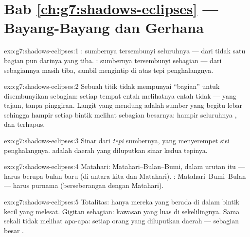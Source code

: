 \section*{Bab \ref{ch:g7:shadows-eclipses} --- Bayang-Bayang dan Gerhana}

\begin{solution}{exo:g7:shadows-eclipses:1}
: sumbernya tersembunyi seluruhnya ---  dari tidak satu
bagian pun darinya yang tiba. : sumbernya tersembunyi sebagian
---  dari sebagiannya masih tiba, sambil mengintip di atas tepi
penghalangnya.
\end{solution}

\begin{solution}{exo:g7:shadows-eclipses:2}
Sebuah titik tidak mempunyai ``bagian'' untuk disembunyikan sebagian:
setiap tempat entah melihatnya entah tidak ---  yang
tajam, tanpa pinggiran. Langit yang mendung adalah sumber yang begitu
lebar sehingga hampir setiap bintik melihat sebagian besarnya: hampir
seluruhnya , dan  terhapus.
\end{solution}

\begin{solution}{exo:g7:shadows-eclipses:3}
Sinar dari \emph{tepi} sumbernya, yang menyerempet sisi penghalangnya.
 adalah daerah yang diluputkan sinar kedua tepinya.
\end{solution}

\begin{solution}{exo:g7:shadows-eclipses:4}
Matahari: Matahari--Bulan--Bumi, dalam urutan itu ---  harus
berupa bulan baru (di antara kita dan Matahari). :
Matahari--Bumi--Bulan ---  harus purnama (berseberangan dengan
Matahari).
\end{solution}

\begin{solution}{exo:g7:shadows-eclipses:5}
Totalitas: hanya mereka yang berada di dalam bintik kecil 
yang melesat. Gigitan sebagian: kawasan  yang luas di
sekelilingnya. Sama sekali tidak melihat apa-apa: setiap orang yang
diluputkan daerah  --- sebagian besar .
\end{solution}

